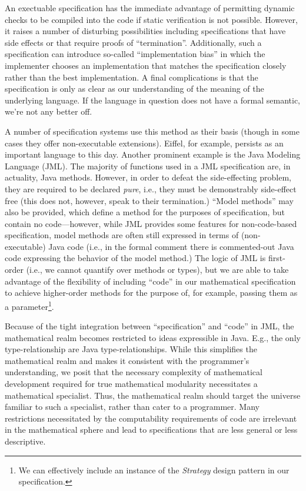 An exectuable specification has the immediate advantage of permitting dynamic checks to be compiled into the code if static verification is not possible.  However, it raises a number of disturbing possibilities including specifications that have side effects or that require proofs of ``termination''.  Additionally, such a specification can introduce so-called ``implementation bias'' in which the implementer chooses an implementation that matches the specification closely rather than the best implementation.  A final complications is that the specification is only as clear as our understanding of the meaning of the underlying language.  If the language in question does not have a formal semantic, we're not any better off.

A number of specification systems use this method as their basis (though in some cases they offer non-executable extensions).  Eiffel, for example, persists as an important language to this day.  Another prominent example is the Java Modeling Language (JML)\cite{leavensJML}.  The majority of functions used in a JML specification are, in actuality, Java methods.  However, in order to defeat the side-effecting problem, they are required to be declared \emph{pure}, i.e., they must be demonstrably side-effect free (this does not, however, speak to their termination.)  ``Model methods'' may also be provided, which define a method for the purposes of specification, but contain no code---however, while JML provides some features for non-code-based specification, model methods are often still expressed in terms of (non-executable) Java code (i.e., in the formal comment there is commented-out Java code expressing the behavior of the model method.)  The logic of JML is first-order (i.e., we cannot quantify over methods or types), but we are able to take advantage of the flexibility of including ``code'' in our mathematical specification to achieve higher-order methods for the purpose of, for example, passing them as a parameter\footnote{We can effectively include an instance of the \emph{Strategy} design pattern in our specification.}.

Because of the tight integration between ``specification'' and ``code'' in JML, the mathematical realm becomes restricted to ideas expressible in Java.  E.g., the only type-relationship are Java type-relationships.  While this simplifies the mathematical realm and makes it consistent with the programmer's understanding, we posit that the necessary complexity of mathematical development required for true mathematical modularity necessitates a mathematical specialist.  Thus, the mathematical realm should target the universe familiar to such a specialist, rather than cater to a programmer.  Many restrictions necessitated by the computability requirements of code are irrelevant in the mathematical sphere and lead to specifications that are less general or less descriptive.

